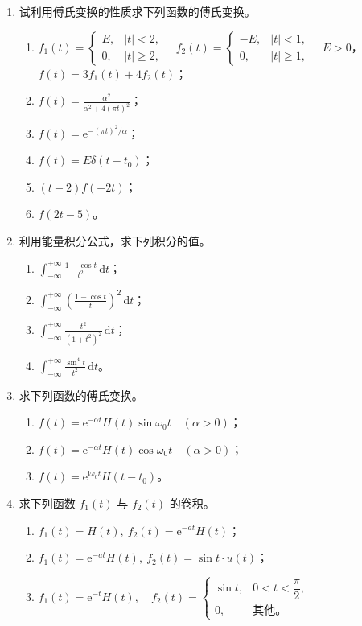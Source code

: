 \documentclass[UTF8,11pt,a4paper]{ctexart}
\newcommand{\dd}{\,\mathrm{d}}
\newcommand{\ee}{\mathrm{e}}
\newcommand{\ii}{\mathrm{i}}
\begin{document}
\begin{enumerate}
\item 试利用傅氏变换的性质求下列函数的傅氏变换。
  \begin{enumerate}
  \item $\displaystyle f_1(t)=\begin{cases}E,&|t|<2,\\0,&|t|\geqslant2,
  \end{cases}\quad
  f_2(t)=\begin{cases}-E,&|t|<1,\\0,&|t|\geqslant1,
  \end{cases}\quad E>0$，$f(t)=3f_1(t)+4f_2(t)$；
  \item $\displaystyle f(t)=\frac{\alpha^2}{\alpha^2+4(\pi t)^2}$；
  \item $\displaystyle f(t)=\ee^{-(\pi t)^2/\alpha}$；
  \item $f(t)=E\delta(t-t_0)$；
  \item $(t-2)f(-2t)$；
  \item $f(2t-5)$。
  \end{enumerate}

\item 利用能量积分公式，求下列积分的值。
  \begin{enumerate}
  \item $\displaystyle\int_{-\infty}^{+\infty}\frac{1-\cos t}{t^2}\dd t$；
  \item $\displaystyle\int_{-\infty}^{+\infty}\left(\frac{1-\cos t}{t}\right)^2\dd t$；
  \item $\displaystyle\int_{-\infty}^{+\infty}\frac{t^2}{(1+t^2)^2}\dd t$；
  \item $\displaystyle\int_{-\infty}^{+\infty}\frac{\sin^4t}{t^2}\dd t$。
  \end{enumerate}

\item 求下列函数的傅氏变换。
  \begin{enumerate}
  \item $f(t)=\ee^{-\alpha t}H(t)\sin\omega_0t\quad(\alpha>0)$；
  \item $f(t)=\ee^{-\alpha t}H(t)\cos\omega_0t\quad(\alpha>0)$；
  \item $f(t)=\ee^{\ii\omega_0t}H(t-t_0)$。
  \end{enumerate}

\item 求下列函数 $f_1(t)$ 与 $f_2(t)$ 的卷积。
  \begin{enumerate}
  \item $f_1(t)=H(t),\ f_2(t)=\ee^{-at}H(t)$；
  \item $f_1(t)=\ee^{-at}H(t),\ f_2(t)=\sin t\cdot u(t)$；
  \item $\displaystyle f_1(t)=\ee^{-t}H(t),\quad
  f_2(t)=\begin{cases}\sin t,&0<t<\dfrac\pi2,\\0,&\text{其他。}\end{cases}$
  \end{enumerate}


\end{enumerate}
\end{document}

